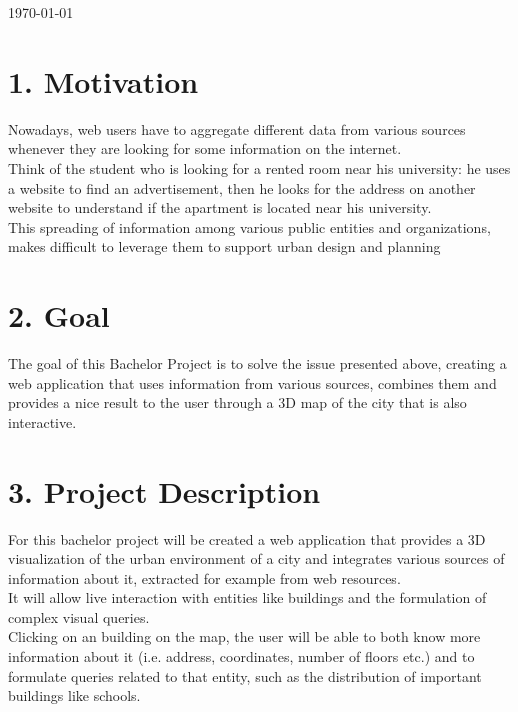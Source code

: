 \documentclass[11pt]{report}
\begin{document}
\begin{titlepage}

{\large \today}\\[3cm] %



 

\vfill %

\end{titlepage}

\section*{1. Motivation}
Nowadays, web users have to aggregate different data from various sources whenever they are looking for some information on the internet. \\Think of the student who is looking for a rented room near his university: he uses a website to find an advertisement, then he looks for the address on another website to understand if the apartment is located near his university.\\
This spreading of information among various public entities and organizations, makes difficult to leverage them to support urban design and planning

\section*{2. Goal}
The goal of this Bachelor Project is to solve the issue presented above, creating a web application that uses information from various sources, combines them and provides a nice result to the user through a 3D map of the city that is also interactive.\\


\section*{3. Project Description}
For this bachelor project will be created a web application that provides a 3D visualization of the urban environment of a city and integrates various sources of information about it, extracted for example from web resources.\\It will allow live interaction with entities like buildings and the formulation of complex visual queries.\\
Clicking on an building on the map, the user will be able to both know more information about it (i.e. address, coordinates, number of floors etc.) and to formulate queries related to that entity, such as the distribution of important buildings like schools.
\end{document}
